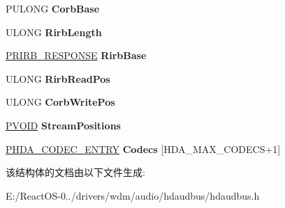 \begin{DoxyCompactItemize}
P\+U\+L\+O\+NG {\bfseries Corb\+Base}
\item 
\mbox{\label{struct_h_d_a___f_d_o___d_e_v_i_c_e___e_x_t_e_n_s_i_o_n_a245b815d26f317f2e15523f8acc4b680}} 
U\+L\+O\+NG {\bfseries Rirb\+Length}
\item 
\mbox{\label{struct_h_d_a___f_d_o___d_e_v_i_c_e___e_x_t_e_n_s_i_o_n_a027718a8439a81026a2b7c24a3a141e9}} 
\hyperlink{struct_r_i_r_b___r_e_s_p_o_n_s_e}{P\+R\+I\+R\+B\+\_\+\+R\+E\+S\+P\+O\+N\+SE} {\bfseries Rirb\+Base}
\item 
\mbox{\label{struct_h_d_a___f_d_o___d_e_v_i_c_e___e_x_t_e_n_s_i_o_n_ad60f199bbf20515838e091fb00c8a709}} 
U\+L\+O\+NG {\bfseries Rirb\+Read\+Pos}
\item 
\mbox{\label{struct_h_d_a___f_d_o___d_e_v_i_c_e___e_x_t_e_n_s_i_o_n_afe57faa4e403c8e2ec701e583ae719f0}} 
U\+L\+O\+NG {\bfseries Corb\+Write\+Pos}
\item 
\mbox{\label{struct_h_d_a___f_d_o___d_e_v_i_c_e___e_x_t_e_n_s_i_o_n_af1d48bc57cad4c20ab09658cb4a6ef2e}} 
\hyperlink{interfacevoid}{P\+V\+O\+ID} {\bfseries Stream\+Positions}
\item 
\mbox{\label{struct_h_d_a___f_d_o___d_e_v_i_c_e___e_x_t_e_n_s_i_o_n_ac1009d668fa908bdd5fb49a827418cc0}} 
\hyperlink{struct_h_d_a___c_o_d_e_c___e_n_t_r_y}{P\+H\+D\+A\+\_\+\+C\+O\+D\+E\+C\+\_\+\+E\+N\+T\+RY} {\bfseries Codecs} \mbox{[}H\+D\+A\+\_\+\+M\+A\+X\+\_\+\+C\+O\+D\+E\+CS+1\mbox{]}
\end{DoxyCompactItemize}


该结构体的文档由以下文件生成\+:\begin{DoxyCompactItemize}
\item 
E\+:/\+React\+O\+S-\/0../drivers/wdm/audio/hdaudbus/hdaudbus.\+h\end{DoxyCompactItemize}
